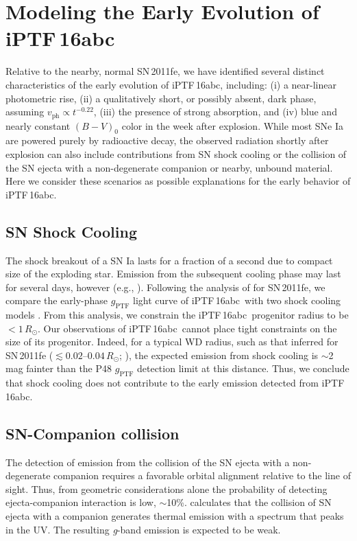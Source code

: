 \documentclass[twocolumn]{aastex61}
\newcommand{\sr}{R_\odot}
\newcommand{\abc}{iPTF\,16abc}
\begin{document}
\section{Modeling the Early Evolution of \abc} \label{sec:lc_energy}

Relative to the nearby, normal SN\,2011fe, we have identified several distinct
characteristics of the early evolution of \abc, including: (i) a near-linear
photometric rise, (ii) a qualitatively short, or possibly absent, dark phase,
assuming $v_\mathrm{ph} \propto t^{-0.22}$, (iii) the presence of strong
 absorption, and (iv) blue and nearly constant $(B - V)_0$
color in the week after explosion. While most SNe Ia are powered purely by
radioactive decay, the observed radiation shortly after explosion can also
include contributions from SN shock cooling or the collision of the SN ejecta
with a non-degenerate companion or nearby, unbound material. Here we
consider these scenarios as possible explanations for the early behavior of
\abc.

\subsection{SN Shock Cooling}

The shock breakout of a SN Ia lasts for a fraction of a second due to compact
size of the exploding star. Emission from the subsequent cooling phase may
last for several days, however (e.g., \citealt{2010ApJ...708..598P}).
Following the analysis of \citet{2012ApJ...744L..17B} for SN\,2011fe, we
compare the early-phase $g_\mathrm{PTF}$ light curve of \abc\ with two shock
cooling models \citep{2011ApJ...728...63R, 2010ApJ...708..598P}. From this
analysis, we constrain the \abc\ progenitor radius to be $<1\,\sr$. Our
observations of \abc\ cannot place tight constraints on the size of its
progenitor. Indeed, for a typical WD radius, such as that inferred for
SN\,2011fe ($\lesssim 0.02$--$0.04\,\sr$; \citealt{2012ApJ...744L..17B,
2014ApJ...784...85P}), the expected emission from shock cooling is
$\sim$2\,mag fainter than the P48 $g_\mathrm{PTF}$ detection limit at this
distance. Thus, we conclude that shock cooling does not contribute to the
early emission detected from \abc.

\subsection{SN-Companion collision}
\label{sec:companion}

The detection of emission from the collision of the SN ejecta with a
non-degenerate companion requires a favorable orbital alignment relative to
the line of sight. Thus, from geometric considerations alone the probability
of detecting ejecta-companion interaction is low, $\sim$10\%.
\citet{2010ApJ...708.1025K} calculates that the collision of SN ejecta with a
companion generates thermal emission with a spectrum that peaks in the UV. The
resulting \textit{g}-band emission is expected to be weak.
\end{document}
